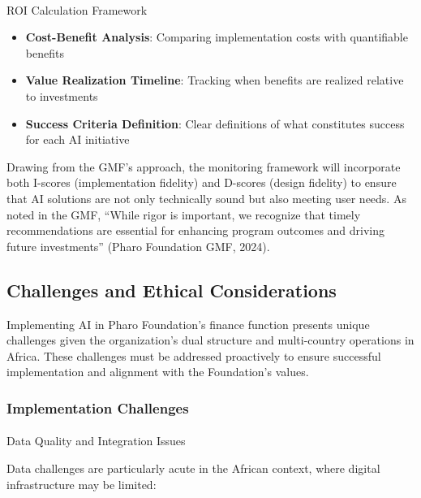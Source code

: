 \documentclass[
]{article}
\makeatletter
\let\oldparagraph\paragraph
\renewcommand{\paragraph}{
    \@ifstar
      \xxxParagraphStar
      \xxxParagraphNoStar
  }
\newcommand{\xxxParagraphStar}[1]{\oldparagraph*{#1}\mbox{}}
\newcommand{\xxxParagraphNoStar}[1]{\oldparagraph{#1}\mbox{}}
\providecommand{\tightlist}{%
  \setlength{\itemsep}{0pt}\setlength{\parskip}{0pt}}\usepackage{longtable,booktabs,array}
\makeatother
\begin{document}
\paragraph{ROI Calculation Framework}\label{roi-calculation-framework}

\begin{itemize}
\tightlist
\item
  \textbf{Cost-Benefit Analysis}: Comparing implementation costs with
  quantifiable benefits
\item
  \textbf{Value Realization Timeline}: Tracking when benefits are
  realized relative to investments
\item
  \textbf{Success Criteria Definition}: Clear definitions of what
  constitutes success for each AI initiative
\end{itemize}

Drawing from the GMF's approach, the monitoring framework will
incorporate both I-scores (implementation fidelity) and D-scores (design
fidelity) to ensure that AI solutions are not only technically sound but
also meeting user needs. As noted in the GMF, ``While rigor is
important, we recognize that timely recommendations are essential for
enhancing program outcomes and driving future investments'' (Pharo
Foundation GMF, 2024).

\subsection{Challenges and Ethical
Considerations}\label{challenges-and-ethical-considerations}

Implementing AI in Pharo Foundation's finance function presents unique
challenges given the organization's dual structure and multi-country
operations in Africa. These challenges must be addressed proactively to
ensure successful implementation and alignment with the Foundation's
values.

\subsubsection{Implementation
Challenges}\label{implementation-challenges}

\paragraph{Data Quality and Integration
Issues}\label{data-quality-and-integration-issues}

Data challenges are particularly acute in the African context, where
digital infrastructure may be limited:
\end{document}
